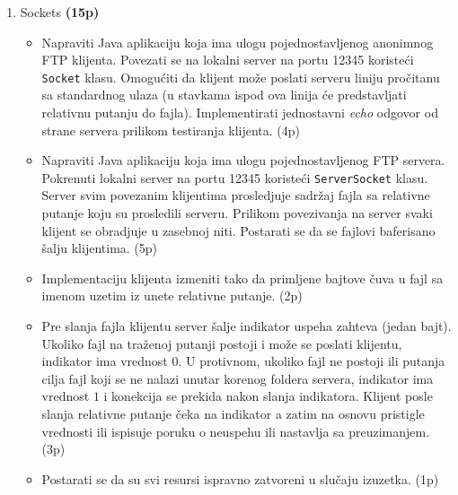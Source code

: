 \documentclass[]{article}
\begin{document}
\begin{enumerate}
  \item Sockets \textbf{(15p)}
  \begin{itemize}
    \item Napraviti Java aplikaciju koja ima ulogu pojednostavljenog anonimnog FTP klijenta. Povezati se na lokalni server na portu 12345 koriste\'c{}i \texttt{Socket} klasu. Omogu\'c{}iti da klijent mo\v{z}e poslati serveru liniju pro\v{c}itanu sa standardnog ulaza (u stavkama ispod ova linija \'c{}e predstavljati relativnu putanju do fajla). Implementirati jednostavni \emph{echo} odgovor od strane servera prilikom testiranja klijenta. \hfill (4p)
    \item Napraviti Java aplikaciju koja ima ulogu pojednostavljenog FTP servera. Pokrenuti lokalni server na portu 12345 koriste\'c{}i \texttt{ServerSocket} klasu. Server svim povezanim klijentima prosledjuje sadr\v{z}aj fajla sa relativne putanje koju su prosledili serveru. Prilikom povezivanja na server svaki klijent se obradjuje u zasebnoj niti. Postarati se da se fajlovi baferisano \v{s}alju klijentima. \hfill (5p)
    \item Implementaciju klijenta izmeniti tako da primljene bajtove \v{c}uva u fajl sa imenom uzetim iz unete relativne putanje. \hfill (2p)
    \item Pre slanja fajla klijentu server \v{s}alje indikator uspeha zahteva (jedan bajt). Ukoliko fajl na tra\v{z}enoj putanji postoji i mo\v{z}e se poslati klijentu, indikator ima vrednost $0$. U protivnom, ukoliko fajl ne postoji ili putanja cilja fajl koji se ne nalazi unutar korenog foldera servera, indikator ima vrednost $1$ i konekcija se prekida nakon slanja indikatora. Klijent posle slanja relativne putanje \v{c}eka na indikator a zatim na osnovu pristigle vrednosti ili ispisuje poruku o neuspehu ili nastavlja sa preuzimanjem. \hfill (3p)
    \item Postarati se da su svi resursi ispravno zatvoreni u slu\v{c}aju izuzetka. \hfill (1p)
  \end{itemize}


\end{enumerate}
\end{document}
